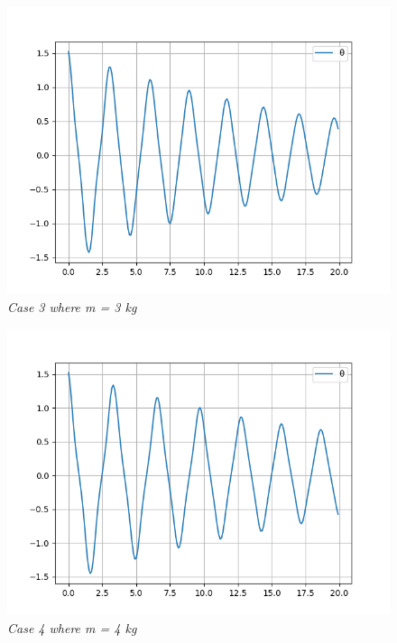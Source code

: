         \begin{figure}[H]
            \centering
            \includegraphics{Appendix/RExpPictures/A/am3.png}
            \caption{\textit{Case 3 where m = 3 kg}}
            \label{}
        \end{figure}
            
        \begin{figure}[H]
            \centering
            \includegraphics{Appendix/RExpPictures/A/am4.png}
            \caption{\textit{Case 4 where m = 4 kg}}
            \label{}
        \end{figure}
            
